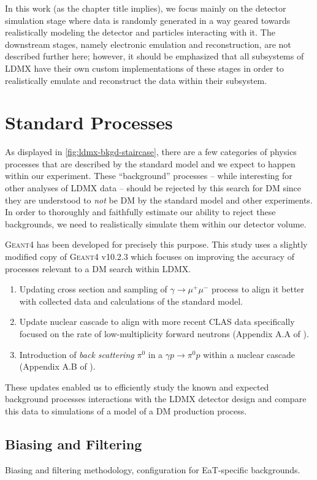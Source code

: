 In this work (as the chapter title implies), we focus mainly on the detector simulation stage where data is randomly generated in a way geared towards realistically modeling the detector and particles interacting with it. The downstream stages, namely electronic emulation and reconstruction, are not described further here; however, it should be emphasized that all subsystems of LDMX have their own custom implementations of these stages in order to realistically emulate and reconstruct the data within their subsystem.

\section{Standard Processes}
As displayed in \cref{fig:ldmx-bkgd-staircase}, there are a few categories of physics processes that are described by the standard model and we expect to happen within our experiment. These ``background'' processes -- while interesting for other analyses of LDMX data -- should be rejected by this search for DM since they are understood to \emph{not} be DM by the standard model and other experiments. In order to thoroughly and faithfully estimate our ability to reject these backgrounds, we need to realistically simulate them within our detector volume.

\textsc{Geant4} \cite{geant4} has been developed for precisely this purpose. This study uses a slightly modified copy of \textsc{Geant4} v10.2.3 which focuses on improving the accuracy of processes relevant to a DM search within LDMX.
\begin{enumerate}
    \item Updating cross section and sampling of $\gamma\to\mu^+\mu^-$ process to align it better with collected data and calculations of the standard model.
    \item Update nuclear cascade to align with more recent CLAS data specifically focused on the rate of low-multiplicity forward neutrons (Appendix A.A of \cite{ldmx-whitepaper}).
    \item Introduction of \emph{back scattering} $\pi^0$ in a $\gamma p \to \pi^0 p$ within a nuclear cascade (Appendix A.B of \cite{ldmx-whitepaper}).
\end{enumerate}
These updates enabled us to efficiently study the known and expected background processes interactions with the LDMX detector design and compare this data to simulations of a model of a DM production process.

\subsection{Biasing and Filtering}
\begin{todoenv}
Biasing and filtering methodology, configuration for EaT-specific backgrounds.
\end{todoenv}

